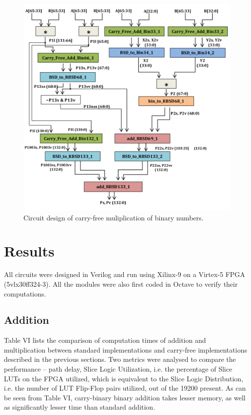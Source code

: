 \documentclass[conference]{IEEEtran_IBSS}
\begin{document}
\begin{figure}[!t]
\centering
\includegraphics[width=\linewidth]{Mul.png}
\caption{Circuit design of carry-free muliplication of binary numbers.}
\label{fig_sim}
\end{figure}


\section{Results}

All circuits were designed in Verilog and run using Xilinx-9 on a Virtex-5 FPGA (5vlx30ff324-3). All the modules were also first coded in Octave to verify their computations.

\subsection{Addition}

Table VI lists the comparison of computation times of addition and multiplication between standard implementations and carry-free implementations described in the previous sections. Two metrics were analysed to compare the performance – path delay, Slice Logic Utilization, i.e. the percentage of Slice LUTs on the FPGA utilized, which is equivalent to the Slice Logic Distribution, i.e. the number of LUT Flip-Flop pairs utilized, out of the 19200 present. As can be seen from Table VI, carry-binary binary addition takes lesser memory, as well as significantly lesser time than standard addition.
\end{document}
